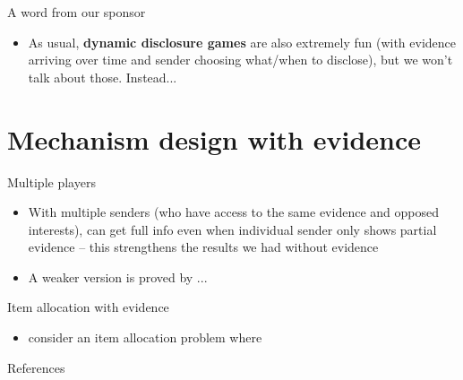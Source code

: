 \documentclass[english,10pt
,aspectratio=169
]{beamer}
\begin{document}
\begin{frame}{A word from our sponsor}
\begin{itemize}
	\item As usual, \textbf{dynamic disclosure games} are also extremely fun (with evidence arriving over time and sender choosing what/when to disclose), but we won't talk about those. Instead... 
\end{itemize}
\end{frame}


\section{Mechanism design with evidence}

\begin{frame}{Multiple players}
\begin{itemize}
	\item With multiple senders (who have access to the same evidence and opposed interests), can get full info even when individual sender only shows partial evidence \citep{milgrom_relying_1986} -- this strengthens the results we had without evidence
	\item A weaker version is proved by ... %
\end{itemize}
\end{frame}


\begin{frame}{Item allocation with evidence}
\begin{itemize}
	\item \cite{ben-porath_mechanisms_2019} consider an item allocation problem where %
\end{itemize}
\end{frame}


\appendix
\begin{frame}[allowframebreaks]{References}


\end{frame}
\end{document}
